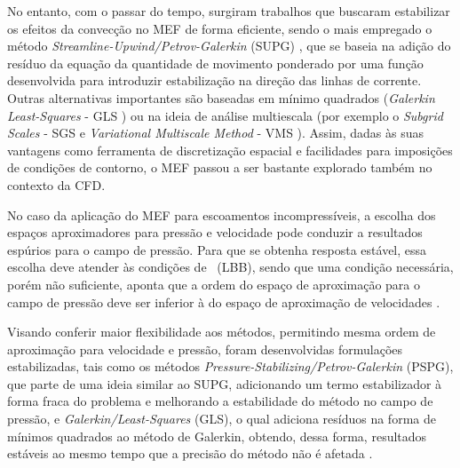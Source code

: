 No entanto, com o passar do tempo, surgiram trabalhos que buscaram estabilizar os efeitos da convecção no MEF de forma eficiente, sendo o mais empregado o método \textit{Streamline-Upwind/Petrov-Galerkin} (SUPG) \cite{brooks1982streamline}, que se baseia na adição do resíduo da equação da quantidade de movimento ponderado por uma função desenvolvida para introduzir estabilização na direção das linhas de corrente. Outras alternativas importantes são baseadas em mínimo quadrados (\textit{Galerkin Least-Squares} - GLS \cite{hughes1989new,tezduyar1991stabilized}) ou na ideia de análise multiescala (por exemplo o \textit{Subgrid Scales} - SGS \cite{piomelli1999large,hughes2000large} e \textit{Variational Multiscale Method} - VMS \cite{hughes1995multiscale,hughes1998variational,hughes2000large}). Assim, dadas às suas vantagens como ferramenta de discretização espacial e facilidades para imposições de condições de contorno, o MEF passou a ser bastante explorado também no contexto da CFD.


No caso da aplicação do MEF para escoamentos incompressíveis, a escolha dos espaços aproximadores para pressão e velocidade pode conduzir a resultados espúrios para o campo de pressão. Para que se obtenha resposta estável, essa escolha deve atender às condições de \LBB\ (LBB), sendo que uma condição necessária, porém não suficiente, aponta que a ordem do espaço de aproximação para o campo de pressão deve ser inferior à do espaço de aproximação de velocidades \cite{BrezziF1991,donea2003finite,fernandes2020tecnica}.

Visando conferir maior flexibilidade aos métodos, permitindo mesma ordem de aproximação para velocidade e pressão, foram desenvolvidas formulações estabilizadas, tais como os métodos \textit{Pressure-Stabilizing/Petrov-Galerkin} (PSPG), que parte de uma ideia similar ao SUPG, adicionando um termo estabilizador à forma fraca do problema e melhorando a estabilidade do método no campo de pressão, e \textit{Galerkin/Least-Squares} (GLS), o qual adiciona resíduos na forma de mínimos quadrados ao método de Galerkin, obtendo, dessa forma, resultados estáveis ao mesmo tempo que a precisão do método não é afetada \cite{hughes1989new,TezduyarS2003}.

